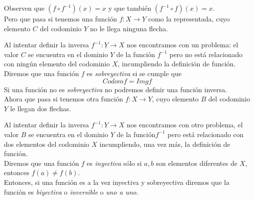 \documentclass[../Teoría.root.tex]{subfiles}
\begin{document}
Observen que \((f \circ f^{−1})(x)=x\) y que también \((f^{−1} \circ f)(x)=x\).\\
Pero que pasa si tenemos una función \(f:X\rightarrow Y\) como la representada, cuyo elemento \(C\) del codominio \(Y\) no le llega ninguna flecha.
\begin{center}
\end{center}
Al intentar definir la inversa \(f^{−1}: Y\rightarrow X\) nos encontramos con un problema:
el valor \(C\) se encuentra en el dominio \(Y\) de la función \(f^{−1}\) pero no está relacionado con ningún elemento del codominio \(X\), incumpliendo la definición de función.\\
Diremos que una función \(f\) es \textit{sobreyectiva} si se cumple que \[Codom f=Img f\] Si una función no es \textit{sobreyectiva} no podremos definir una función inversa.\\
Ahora que pasa si tenemos otra función \(f:X\rightarrow Y\), cuyo elemento \(B\) del codominio \(Y\) le llegan dos flechas.
\begin{center}
\end{center}
Al intentar definir la inversa \(f^{−1}: Y\rightarrow X\) nos encontramos con otro problema, el valor \(B\) se encuentra en el dominio \(Y\) de la función\(f^{−1}\) pero está relacionado con dos elementos del codominio \(X\) incumpliendo, una vez más, la definición de función.\\
Diremos que una función \(f\) es \textit{inyectiva} sólo si \(a,b\) son elementos diferentes de \(X\), entonces \(f(a)\neq f(b)\).\\
Entonces, si una función es a la vez inyectiva y sobreyectiva diremos que la función es \textit{biyectiva} o \textit{inversible} o \textit{uno a uno}.
\end{document}
